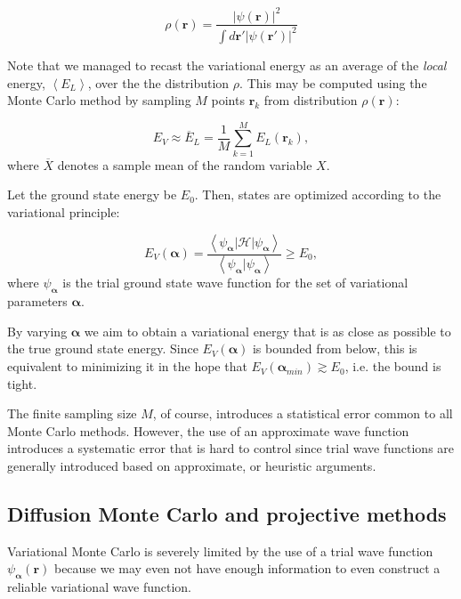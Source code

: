 \begin{equation}\label{eq:rho}
\rho (\bm r) = \frac{ | \psi (\bm r) |^2}{ \int d\bm r' | \psi (\bm r') |^2}
\end{equation}

Note that we managed to recast the variational energy as an average of the \emph{local} energy, $\left\langle E_L \right\rangle $, over the the distribution $\rho$.
This may be computed using the Monte Carlo method by sampling $M$ points $\bm r_k$ from distribution $\rho (\bm r)$:

\begin{equation}\label{eq:average}
E_V \approx \overline{E}_L = \frac{1}{M} \sum_{k= 1}^{M} E_L (\bm r_k) ,
\end{equation}
where $\overline {X}$ denotes a sample mean of the random variable $X$.

Let the ground state energy be $E_0$.
Then, states are optimized according to the variational principle:

\begin{equation}
E_V(\bm \alpha) = \frac{\left\langle \psi_{\bm \alpha} | \mathcal{H} | \psi_{\bm \alpha} \right\rangle}{\left\langle\psi_{\bm \alpha} | \psi_{\bm \alpha} \right\rangle} \ge E_0,
\end{equation}
where $\psi_{\bm \alpha}$ is the trial ground state wave function for the set of variational parameters ${\bm \alpha}$.

By varying $\bm \alpha$ we aim to obtain a variational energy that is as close as possible to the true ground state energy.
Since $E_V(\bm \alpha)$ is bounded from below, this is equivalent to minimizing it in the hope that $E_V(\bm \alpha_{min}) \gtrsim E_0$, i.e. the bound is tight.

The finite sampling size $M$, of course, introduces a statistical error common to all Monte Carlo methods. 
However, the use of an approximate wave function introduces a systematic error that is hard to control since trial wave functions are generally introduced based on approximate, or heuristic arguments.

\subsection{Diffusion Monte Carlo and projective methods}\label{subsec:dmc}

Variational Monte Carlo is severely limited by the use of a trial wave function $\psi_{\bm \alpha} (\bm r)$ because we may even not have enough information to even construct a reliable variational wave function.

